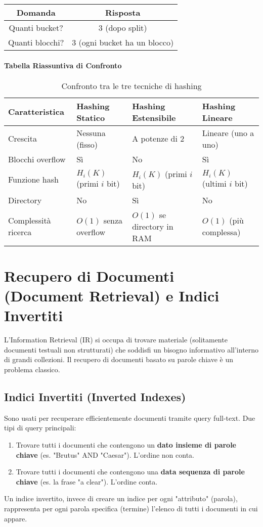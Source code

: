 \begin{center}
\begin{tabular}{|c|c|}
\hline
\textbf{Domanda} & \textbf{Risposta} \\
\hline
Quanti bucket? & 3 (dopo split) \\
\hline
Quanti blocchi? & 3 (ogni bucket ha un blocco) \\
\hline
\end{tabular}
\end{center}

\paragraph{Tabella Riassuntiva di Confronto}
\begin{table}[h]
\centering
\begin{tabular}{|p{3cm}|p{3.5cm}|p{3.5cm}|p{3.5cm}|}
\hline
\textbf{Caratteristica} & \textbf{Hashing Statico} & \textbf{Hashing Estensibile} & \textbf{Hashing Lineare} \\
\hline
Crescita & Nessuna (fisso) & A potenze di 2 & Lineare (uno a uno) \\
\hline
Blocchi overflow & Sì & No & Sì \\
\hline
Funzione hash & $H_i(K)$ (primi $i$ bit) & $H_i(K)$ (primi $i$ bit) & $H_i(K)$ (ultimi $i$ bit) \\
\hline
Directory & No & Sì & No \\
\hline
Complessità ricerca & $O(1)$ senza overflow & $O(1)$ se directory in RAM & $O(1)$ (più complessa) \\
\hline
\end{tabular}
\caption{Confronto tra le tre tecniche di hashing}
\end{table}

\section{Recupero di Documenti (Document Retrieval) e Indici Invertiti}
L'Information Retrieval (IR) si occupa di trovare materiale (solitamente documenti testuali non strutturati) che soddisfi un bisogno informativo all'interno di grandi collezioni. Il recupero di documenti basato su parole chiave è un problema classico.

\subsection{Indici Invertiti (Inverted Indexes)}
Sono usati per recuperare efficientemente documenti tramite query full-text.
Due tipi di query principali:
\begin{enumerate}
    \item Trovare tutti i documenti che contengono un \textbf{dato insieme di parole chiave} (es. "Brutus" AND "Caesar"). L'ordine non conta.
    \item Trovare tutti i documenti che contengono una \textbf{data sequenza di parole chiave} (es. la frase "a clear"). L'ordine conta.
\end{enumerate}
Un indice invertito, invece di creare un indice per ogni "attributo" (parola), rappresenta per ogni parola specifica (termine) l'elenco di tutti i documenti in cui appare.

